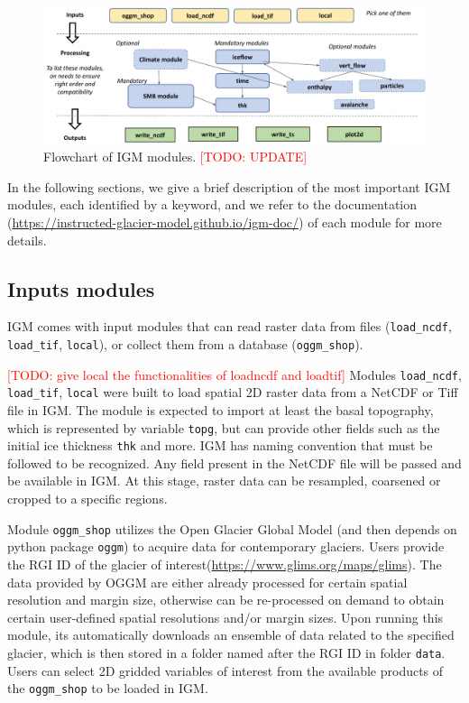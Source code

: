 \documentclass[gmd]{copernicus}
\begin{document}
\begin{figure}[!ht]
\begin{center}
\includegraphics[width=\textwidth]{fig/IGM-modules-flowchart.pdf}
\caption{Flowchart of IGM modules. \textcolor{red}{[TODO: UPDATE]}}
\label{flowchart}
\end{center}
\end{figure}

In the following sections, we give a brief description of the most important IGM modules, each identified by a keyword, and we refer to the documentation (\url{https://instructed-glacier-model.github.io/igm-doc/}) of each module for more details.

\subsection{Inputs modules}

IGM comes with input modules that can read raster data from files (\texttt{load\_ncdf},  \texttt{load\_tif}, \texttt{local}), or collect them from a database (\texttt{oggm\_shop}).

\textcolor{red}{[TODO: give local the functionalities of loadncdf and loadtif]} Modules \texttt{load\_ncdf}, \texttt{load\_tif}, \texttt{local} were built to load spatial 2D raster data from a NetCDF or Tiff file in IGM. The module is expected to import at least the basal topography, which is represented by variable \texttt{topg}, but can provide other fields such as the initial ice thickness \texttt{thk} and more. IGM has naming convention that must be followed to be recognized. Any field present in the NetCDF file will be passed and be available in IGM. At this stage, raster data can be resampled, coarsened or cropped to a specific regions.

Module \texttt{oggm\_shop} utilizes the Open Glacier Global Model \citep[OGGM][]{maussion2019open} (and then depends on python package \texttt{oggm}) to acquire data for contemporary glaciers. Users provide the RGI ID of the glacier of interest(\url{https://www.glims.org/maps/glims}). The data provided by OGGM are either already processed for certain spatial resolution and margin size, otherwise can be re-processed on demand to obtain certain user-defined spatial resolutions and/or margin sizes. Upon running this module, its automatically downloads an ensemble of data related to the specified glacier, which is then stored in a folder named after the RGI ID in folder \texttt{data}. Users can select 2D gridded variables of interest from the available products of the \texttt{oggm\_shop} to be loaded in IGM.
\end{document}

